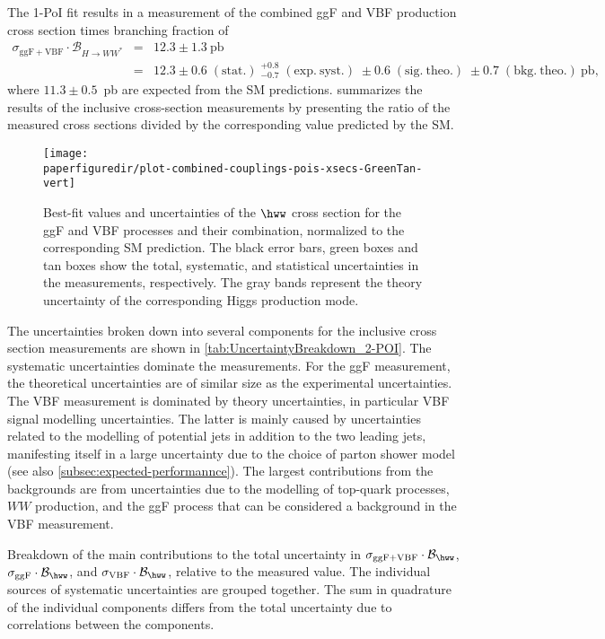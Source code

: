 The 1-PoI fit results in a measurement of the combined ggF and VBF production cross section times branching fraction of
\begin{eqnarray*}
  \sigma_{\mathrm{ggF+VBF}} \cdot \mathcal{B}_{H \to WW^{\ast}} &=& 12.3 \pm 1.3~\mathrm{pb} \\
  &=& 12.3 \pm 0.6\;(\mathrm{stat.})\;^{+0.8}_{-0.7}\;(\mathrm{exp.\ syst.})\;\pm 0.6\;(\mathrm{sig.\ theo.})\;\pm 0.7\;(\mathrm{bkg.\ theo.})~\mathrm{pb},
\end{eqnarray*}
where $11.3\pm 0.5$~pb are expected from the SM predictions.
 summarizes the results of the inclusive cross-section measurements by presenting the ratio of the measured cross sections divided by the corresponding value predicted by the SM.
\begin{figure}[htb]
  \centering
    \texttt{[image: \\paperfiguredir/plot-combined-couplings-pois-xsecs-GreenTan-vert]}
    \caption{
      Best-fit values and uncertainties of the $\hww$ cross section for the ggF and VBF processes and their combination, normalized to the corresponding SM prediction.
      The black error bars, green boxes and tan boxes show the total, systematic, and statistical uncertainties in the measurements, respectively.
      The gray bands represent the theory uncertainty of the corresponding Higgs production mode.
      \label{fig:couplings-POIs}
    }
\end{figure}
The uncertainties broken down into several components for the inclusive cross section measurements are shown in \cref{tab:UncertaintyBreakdown_2-POI}. 
The systematic uncertainties dominate the measurements. 
For the ggF measurement, the theoretical uncertainties are of similar size as the experimental uncertainties.
The VBF measurement is dominated by theory uncertainties, in particular VBF signal modelling uncertainties.
The latter is mainly caused by uncertainties related to the modelling of potential jets in addition to the two leading jets, manifesting itself in a large uncertainty due to the choice of parton shower model (see also \cref{subsec:expected-performannce}). The largest contributions from the backgrounds are from uncertainties due to the modelling of top-quark processes, $WW$ production, and the ggF process that can be considered a background in the VBF measurement. 

\begin{table}[htb]
  \centering
  \caption{
    Breakdown of the main contributions to the total uncertainty in $\sigma_{\mathrm{ggF+VBF}} \cdot \mathcal{B}_{\hww}$, $\sigma_{\mathrm{ggF}} \cdot \mathcal{B}_{\hww}$, and $\sigma_{\mathrm{VBF}} \cdot \mathcal{B}_{\hww}$, relative to the measured value.
    The individual sources of systematic uncertainties are grouped together.
    The sum in quadrature of the individual components differs from the total uncertainty due to correlations between the components.
  }
  \resizebox{\textwidth}{!}{
    
  }
  \label{tab:UncertaintyBreakdown_2-POI}
\end{table}

